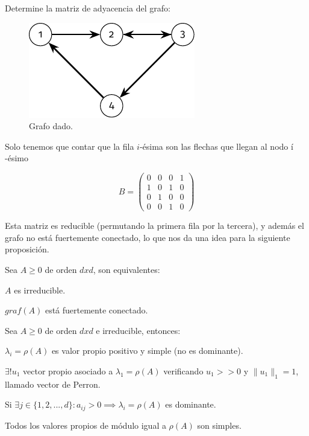 \begin{ejemplo}
Determine la matriz de adyacencia del grafo:
\begin{figure}[H]
	\caption{Grafo dado.}
	\centering \includegraphics{./img/grafo_2.pdf}
\end{figure}

Solo tenemos que contar que la fila $i$-ésima son las flechas que llegan al nodo $í$-ésimo

$$ B =
\begin{pmatrix}
0 & 0 & 0 & 1 \\
1 & 0 & 1 & 0 \\
0 & 1 & 0 & 0 \\
0 & 0 & 1 & 0
\end{pmatrix}
$$

\begin{ejemplo}
Esta matriz es reducible (permutando la primera fila por la tercera), y además el grafo no está fuertemente conectado, lo que nos da una idea para la siguiente proposición.
\end{ejemplo}
\end{ejemplo}

\begin{nprop}
Sea $A\geq0$ de orden $dxd$, son equivalentes:
\begin{nlist}
\item $A$ es irreducible.
\item $graf(A)$ está fuertemente conectado.
\end{nlist}
\end{nprop}

\begin{nth}
Sea $A\geq0$ de orden $dxd$ e irreducible, entonces:
\begin{nlist}
\item $\lambda_{i}=\rho(A)$ es valor propio positivo y simple (no es dominante).
\item $\exists!u_{1}$ vector propio asociado a $\lambda_{1}=\rho(A)$ verificando $u_{1} >> 0$ y $\|u_{1}\|_{1}=1$, llamado vector de Perron.
\item Si $\exists j\in\{1,2,...,d\} : a_{ij} > 0 \implies \lambda_{i}=\rho(A)$ es dominante.
\item Todos los valores propios de módulo igual a $\rho(A)$ son simples.
\end{nlist}
\end{nth}

